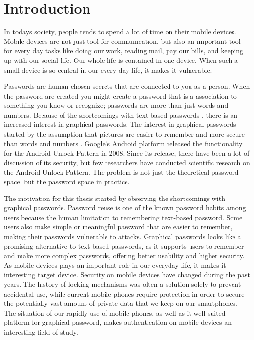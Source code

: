 \chapter{Introduction}

  In todays society, people tends to spend a lot of time on their mobile devices. Mobile devices are not just tool for communication, but also an important tool for every day tasks like doing our work, reading mail, pay our bills, and keeping up with our social life. Our whole life is contained in one device. When such a small device is so central in our every day life, it makes it vulnerable.

  Passwords are human-chosen secrets that are connected to you as a person. When the password are created you might create a password that is a association to something you know or recognize; passwords are more than just words and numbers. Because of the shortcomings with text-based passwords \cite{UnixPasswords}, there is an increased interest in graphical passwords. The interest in graphical passwords started by the assumption that pictures are easier to remember and more secure than words and numbers \cite{DeAngeli}. Google's Android platform released the functionality for the Android Unlock Pattern in 2008. Since its release, there have been a lot of discussion of its security, but few researchers have conducted scientific research on the Android Unlock Pattern. The problem is not just the theoretical password space, but the password space in practice. 

  The motivation for this thesis started by observing the shortcomings with graphical passwords. Password reuse is one of the known password habits among users because the human limitation to remembering text-based password. Some users also make simple or meaningful password that are easier to remember, making their passwords vulnerable to attacks. Graphical passwords looks like a promising alternative to text-based passwords, as it supports users to remember and make more complex passwords, offering better usability and higher security. As mobile devices plays an important role in our everyday life, it makes it interesting target device. Security on mobile devices have changed during the past years. The history of locking mechanisms was often a solution solely to prevent accidental use, while current mobile phones require protection in order to secure the potentially vast amount of private data that we keep on our smartphones. The situation of our rapidly use of mobile phones, as well as it well suited platform for graphical password, makes authentication on mobile devices an interesting field of study.

